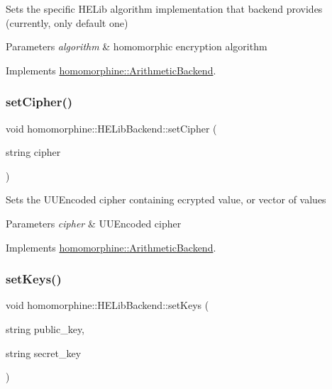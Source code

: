 Sets the specific H\+E\+Lib algorithm implementation that backend provides (currently, only default one)


\begin{DoxyParams}{Parameters}
{\em algorithm} & homomorphic encryption algorithm \\
\hline
\end{DoxyParams}


Implements \hyperlink{classhomomorphine_1_1_arithmetic_backend_ac53135f4f66a2f7a33d3c6e6d465b86f}{homomorphine\+::\+Arithmetic\+Backend}.

\mbox{\label{classhomomorphine_1_1_h_e_lib_backend_a5baa6ad05fbb23d27c4ec4bb018a8c64}} 
\subsubsection{\texorpdfstring{set\+Cipher()}{setCipher()}}
{\footnotesize\ttfamily void homomorphine\+::\+H\+E\+Lib\+Backend\+::set\+Cipher (\begin{DoxyParamCaption}\item[{string}]{cipher }\end{DoxyParamCaption})\hspace{0.3cm}{\ttfamily [virtual]}}

Sets the U\+U\+Encoded cipher containing ecrypted value, or vector of values


\begin{DoxyParams}{Parameters}
{\em cipher} & U\+U\+Encoded cipher \\
\hline
\end{DoxyParams}


Implements \hyperlink{classhomomorphine_1_1_arithmetic_backend_af9b2d3b33a03d79facdf113c9560fc0b}{homomorphine\+::\+Arithmetic\+Backend}.

\mbox{\label{classhomomorphine_1_1_h_e_lib_backend_a2980c8eaf3556057aac364a1e61ab8cd}} 
\subsubsection{\texorpdfstring{set\+Keys()}{setKeys()}}
{\footnotesize\ttfamily void homomorphine\+::\+H\+E\+Lib\+Backend\+::set\+Keys (\begin{DoxyParamCaption}\item[{string}]{public\+\_\+key,  }\item[{string}]{secret\+\_\+key }\end{DoxyParamCaption})\hspace{0.3cm}{\ttfamily [virtual]}}

